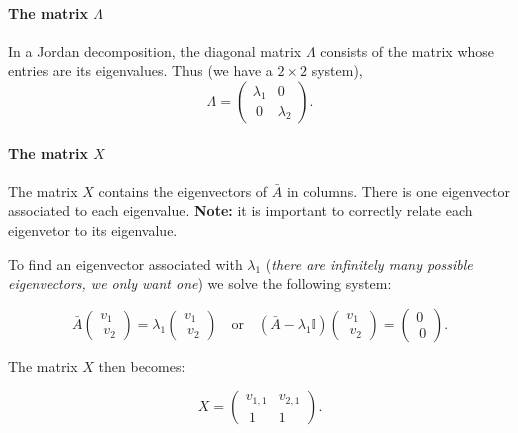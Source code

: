 \documentclass[11pt,a4paper,english]{article}
\begin{document}
\hypertarget{the-matrix-lambda}{%
\paragraph{\texorpdfstring{The matrix
\(\Lambda\)}{The matrix \textbackslash{}Lambda}}\label{the-matrix-lambda}}

In a Jordan decomposition, the diagonal matrix \(\Lambda\) consists of
the matrix whose entries are its eigenvalues. Thus (we have a
\(2 \times 2\) system), \[\Lambda = \begin{pmatrix} 
    \lambda_{1} & 0  \\\
    0 & \lambda_{2} 
\end{pmatrix}.\]

\hypertarget{the-matrix-x}{%
\paragraph{\texorpdfstring{The matrix
\(X\)}{The matrix X}}\label{the-matrix-x}}

The matrix \(X\) contains the eigenvectors of \(\bar{A}\) in columns.
There is one eigenvector associated to each eigenvalue. \textbf{Note:}
it is important to correctly relate each eigenvetor to its eigenvalue.

To find an eigenvector associated with \(\lambda_{1}\) (\emph{there are
infinitely many possible eigenvectors, we only want one}) we solve the
following system:

\[\bar{A} \begin{pmatrix} v_{1} \\\ v_{2} \end{pmatrix} = \lambda_{1} \begin{pmatrix} v_{1} \\\ v_{2} \end{pmatrix} \quad \mathrm{or} \quad (\bar{A} - \lambda_{1} \mathbb{I}) 
\begin{pmatrix} v_{1} \\\ v_{2} \end{pmatrix} = \begin{pmatrix} 0 \\\ 0 \end{pmatrix}.\]

The matrix \(X\) then becomes:

\[X = \begin{pmatrix} v_{1,1} & v_{2,1} \\\ 1 & 1 \end{pmatrix}.\]
\end{document}
